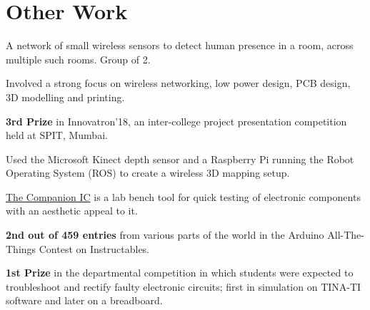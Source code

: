 \documentclass[]{deedy-resume-openfont}
\begin{document}
\section{Other Work}

\begin{tightemize}
\item A network of small wireless sensors to detect human presence in a room, across multiple such rooms. Group of 2.
\item Involved a strong focus on wireless networking, low power design, PCB design, 3D modelling and printing.
\item \textbf{3rd Prize} in Innovatron’18, an inter-college project presentation competition held at SPIT, Mumbai.
\end{tightemize}
\sectionsep

\begin{tightemize}
	\item Used the Microsoft Kinect depth sensor and a Raspberry Pi running the Robot Operating System (ROS) to create a wireless 3D mapping setup.  
\end{tightemize}
\sectionsep

\begin{tightemize}
	\item \href{https://www.instructables.com/id/The-Companion-IC/}{The Companion IC} is a lab bench tool for quick testing of electronic components with an aesthetic appeal to it.
	\item \textbf{2nd out of 459 entries} from various parts of the world in the Arduino All-The-Things Contest on Instructables.
\end{tightemize}
\sectionsep

\begin{tightemize}
	\item \textbf{1st Prize} in the departmental competition in which students were expected to troubleshoot and rectify faulty electronic circuits; first in simulation on TINA-TI software and later on a breadboard.
\end{tightemize}
\sectionsep
\end{document}
